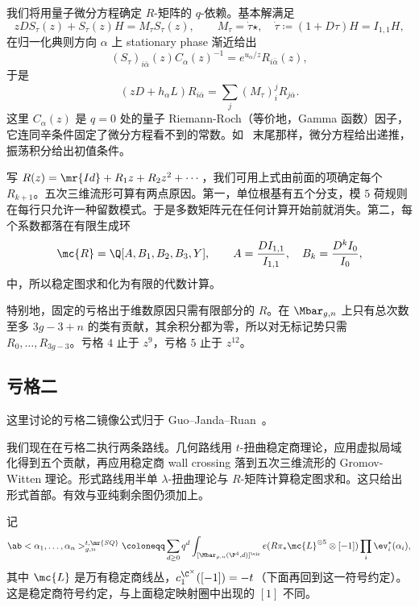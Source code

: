 我们将用量子微分方程确定 \(R\)-矩阵的 \(q\)-依赖。基本解满足
\[ zDS_{\tau}(z) + S_{\tau}(z)H = M_{\tau}S_{\tau}(z), \qquad M_{\tau} = \dot{\tau}\star, \quad \dot{\tau} \coloneqq (1+D\tau)H = I_{1,1}H, \]
在归一化典则方向 \(\alpha\) 上 stationary phase 渐近给出
\[ (S_{\tau})_{i\bar{\alpha}}(z)C_{\alpha}(z)^{-1} = e^{u_{\alpha}/z}R_{i\bar{\alpha}}(z), \]
于是
\[ (zD+h_{\alpha}L)R_{i\bar{\alpha}} = \sum_j (M_{\tau})_i^j R_{j\bar{\alpha}}. \]
这里 \(C_{\alpha}(z)\) 是 \(q=0\) 处的量子 Riemann-Roch（等价地，Gamma 函数）因子，它连同辛条件固定了微分方程看不到的常数。如~ 末尾那样，微分方程给出递推，振荡积分给出初值条件。

写 \(R(z) = \mr{Id} + R_1 z + R_2 z^2 + \cdots\)，我们可用上式由前面的项确定每个 \(R_{k+1}\)。五次三维流形可算有两点原因。第一，单位根基有五个分支，模 \(5\) 荷规则在每行只允许一种留数模式。于是多数矩阵元在任何计算开始前就消失。第二，每个系数都落在有限生成环
\[ \mc{R} = \Q[A,B_1,B_2,B_3,Y], \qquad A = \frac{DI_{1,1}}{I_{1,1}}, \quad B_k = \frac{D^k I_0}{I_0}, \]
中，所以稳定图求和化为有限的代数计算。

\begin{rmk}
    特别地，固定的亏格出于维数原因只需有限部分的 \(R\)。在 \(\Mbar_{g,n}\) 上只有总次数至多 \(3g-3+n\) 的类有贡献，其余积分都为零，所以对无标记势只需 \(R_0, \ldots, R_{3g-3}\)。亏格 \(4\) 止于 \(z^9\)，亏格 \(5\) 止于 \(z^{12}\)。
\end{rmk}

\subsection{亏格二}%
\label{sub:Genus two}

这里讨论的亏格二镜像公式归于 Guo--Janda--Ruan~\cite{GJRgenus2}。

我们现在在亏格二执行两条路线。几何路线用 \(t\)-扭曲稳定商理论，应用虚拟局域化得到五个贡献，再应用稳定商 wall crossing 落到五次三维流形的 Gromov-Witten 理论。形式路线用半单 \(\lambda\)-扭曲理论与 \(R\)-矩阵计算稳定图求和。这只给出形式首部。有效与亚纯剩余图仍须加上。

\begin{notn}
    记
    \[ \ab<\alpha_1, \ldots, \alpha_n>^{t,\mr{SQ}}_{g,n} \coloneqq \sum_{d\geq0}q^d \int_{[\Mbar_{g,n}(\P^4,d)]^{\vir}}e(R\pi_*\mc{L}^{\otimes 5}\otimes[-1])\prod_i \ev_i^*(\alpha_i), \]
    其中 \(\mc{L}\) 是万有稳定商线丛，\(c_1^{\C^{\times}}([-1]) = -t\)（下面再回到这一符号约定）。这是稳定商符号约定，与上面稳定映射圈中出现的 \([1]\) 不同。
\end{notn}

